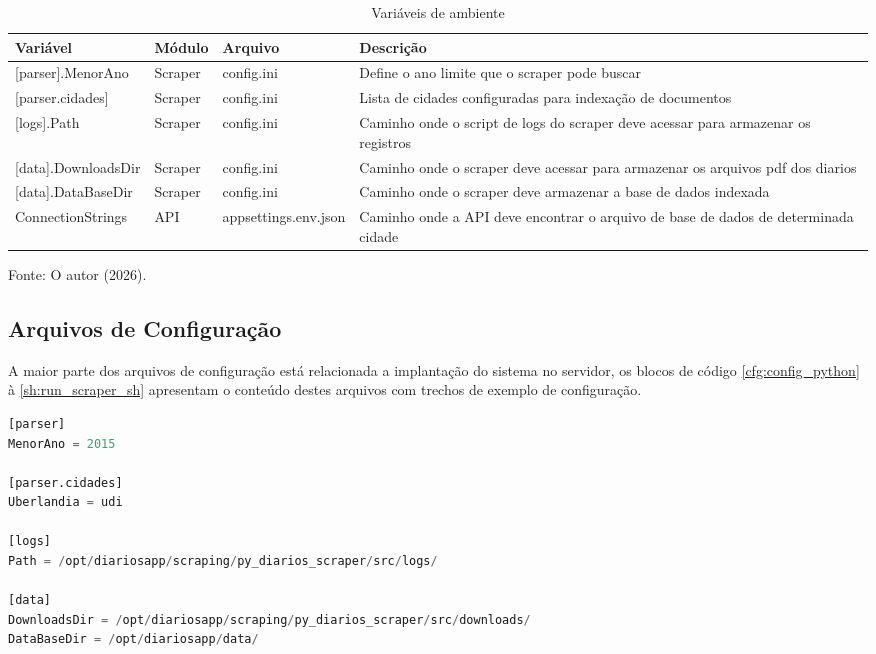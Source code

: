 \begin{table}[h]
    \centering
    \caption{Variáveis de ambiente}
    \label{tab:tabela_variaveis_de_ambiente}
    \begin{tabularx}{\textwidth}{l l l X}
        \toprule
        Variável & Módulo & Arquivo & Descrição \\
        \midrule
        {}[parser{}].MenorAno & Scraper & config.ini & Define o ano limite que o scraper pode buscar \\ 
        {}[parser.cidades{}] & Scraper & config.ini & Lista de cidades configuradas para indexação de documentos \\
        {}[logs{}].Path & Scraper & config.ini & Caminho onde o script de logs do scraper deve acessar para armazenar os registros \\
        {}[data{}].DownloadsDir & Scraper & config.ini & Caminho onde o scraper deve acessar para armazenar os arquivos pdf dos diarios \\
        {}[data{}].DataBaseDir & Scraper & config.ini & Caminho onde o scraper deve armazenar a base de dados indexada \\
        ConnectionStrings & API & appsettings.env.json & Caminho onde a API deve encontrar o arquivo de base de dados de determinada cidade \\
        \bottomrule
    \end{tabularx}
\end{table}{\footnotesize Fonte: O autor (2026).}



\subsection{Arquivos de Configuração}

A maior parte dos arquivos de configuração está relacionada a implantação do sistema no servidor, os blocos de código \ref{cfg:config_python} à \ref{sh:run_scraper_sh} apresentam o conteúdo destes arquivos com trechos de exemplo de configuração.

\begin{lstlisting}[caption={config.ini}, label={cfg:config_python}, language=Python]
[parser]
MenorAno = 2015

[parser.cidades]
Uberlandia = udi

[logs]
Path = /opt/diariosapp/scraping/py_diarios_scraper/src/logs/

[data]
DownloadsDir = /opt/diariosapp/scraping/py_diarios_scraper/src/downloads/
DataBaseDir = /opt/diariosapp/data/
\end{lstlisting}

